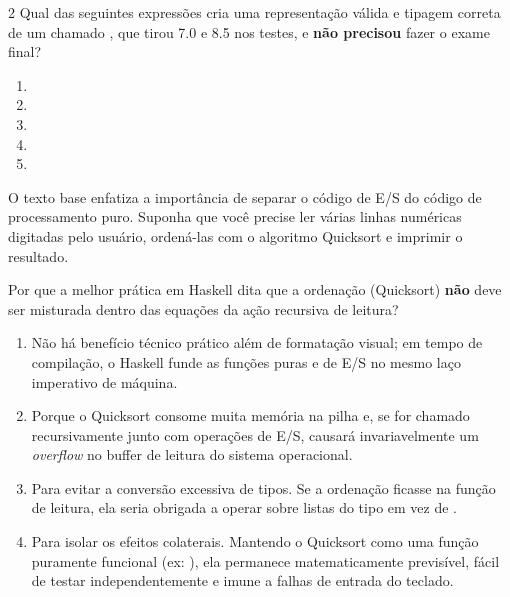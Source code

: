 \documentclass[a4paper,10pt,brazil]{article}
\begin{document}
\begin{multicols}{2}
Qual das seguintes expressões cria uma representação válida e tipagem correta de um  chamado , que tirou 7.0 e 8.5 nos testes, e \textbf{não precisou} fazer o exame final?

\begin{enumerate}
  \item {}

  \item {}

  \item {}

  \item {}

  \item {}


\end{enumerate}

O texto base enfatiza a importância de separar o código de E/S do código de processamento puro. Suponha que você precise ler várias linhas numéricas digitadas pelo usuário, ordená-las com o algoritmo Quicksort e imprimir o resultado. 

Por que a melhor prática em Haskell dita que a ordenação (Quicksort) \textbf{não} deve ser misturada dentro das equações da ação recursiva de leitura?

\begin{enumerate}
  \item Não há benefício técnico prático além de formatação visual; em tempo de compilação, o Haskell funde as funções puras e de E/S no mesmo laço imperativo de máquina.

  \item Porque o Quicksort consome muita memória na pilha e, se for chamado recursivamente junto com operações de E/S, causará invariavelmente um \emph{overflow} no buffer de leitura do sistema operacional.

  \item Para evitar a conversão excessiva de tipos. Se a ordenação ficasse na função de leitura, ela seria obrigada a operar sobre listas do tipo \haskellinline{[IO Int]} em vez de \haskellinline{[Int]}.

  \item Para isolar os efeitos colaterais. Mantendo o Quicksort como uma função puramente funcional (ex: \haskellinline{[Int] -> [Int]}), ela permanece matematicamente previsível, fácil de testar independentemente e imune a falhas de entrada do teclado.


\end{enumerate}
\end{multicols}
\end{document}
